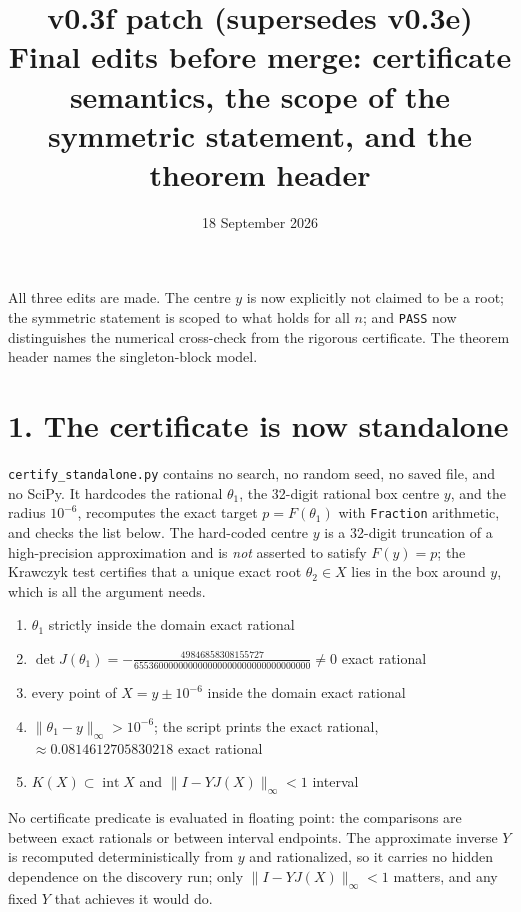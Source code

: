 \documentclass[11pt]{article}
\title{\textbf{v0.3f patch} \small(supersedes v0.3e)\\[2pt]
\large Final edits before merge: certificate semantics, the scope of the\\ symmetric statement, and the theorem header}
\author{18 September 2026}
\date{}
\theoremstyle{remark}
\begin{document}
\maketitle
\vspace{-2.5em}

All three edits are made. The centre $y$ is now explicitly not claimed to be a root; the symmetric statement is scoped to what holds for all $n$; and \texttt{PASS} now distinguishes the numerical cross-check from the rigorous certificate. The theorem header names the singleton-block model.

\section*{1. The certificate is now standalone}

\texttt{certify\_standalone.py} contains no search, no random seed, no saved file, and no SciPy. It hardcodes the rational $\theta_1$, the 32-digit rational box centre $y$, and the radius $10^{-6}$, recomputes the exact target $p=F(\theta_1)$ with \texttt{Fraction} arithmetic, and checks the list below. The hard-coded centre $y$ is a 32-digit truncation of a high-precision approximation and is \emph{not} asserted to satisfy $F(y)=p$; the Krawczyk test certifies that a unique exact root $\theta_2\in X$ lies in the box around $y$, which is all the argument needs.
\begin{enumerate}[label=(C\arabic*)]
\item $\theta_1$ strictly inside the domain \hfill exact rational
\item $\det J(\theta_1)=-\tfrac{49846858308155727}{655360000000000000000000000000000000}\neq0$ \hfill exact rational
\item every point of $X=y\pm10^{-6}$ inside the domain \hfill exact rational
\item $\|\theta_1-y\|_\infty>10^{-6}$; the script prints the exact rational, $\approx0.0814612705830218$ \hfill exact rational
\item $K(X)\subset\operatorname{int}X$ and $\|I-YJ(X)\|_\infty<1$ \hfill interval
\end{enumerate}
No certificate predicate is evaluated in floating point: the comparisons are between exact rationals or between interval endpoints. The approximate inverse $Y$ is recomputed deterministically from $y$ and rationalized, so it carries no hidden dependence on the discovery run; only $\|I-YJ(X)\|_\infty<1$ matters, and any fixed $Y$ that achieves it would do.
\end{document}
